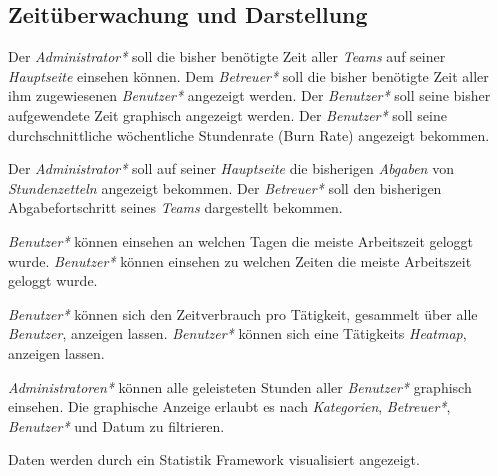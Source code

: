 \subsection{Zeitüberwachung und Darstellung}
    \begin{requirements}
        \begin{requirements}
             Der \emph{Administrator*} soll die bisher benötigte Zeit aller \emph{Teams} auf seiner \emph{Hauptseite} einsehen können.
             Dem \emph{Betreuer*} soll die bisher benötigte Zeit aller ihm zugewiesenen \emph{Benutzer*} angezeigt werden.
             Der \emph{Benutzer*} soll seine bisher aufgewendete Zeit graphisch angezeigt werden.
             Der \emph{Benutzer*} soll seine durchschnittliche wöchentliche Stundenrate (Burn Rate) angezeigt bekommen.
        \end{requirements}

        \begin{requirements}
             Der \emph{Administrator*} soll auf seiner \emph{Hauptseite} die bisherigen \emph{Abgaben} von \emph{Stundenzetteln} angezeigt bekommen.
             Der \emph{Betreuer*} soll den bisherigen Abgabefortschritt seines \emph{Teams} dargestellt bekommen.
        \end{requirements}

        \begin{requirements}
             \emph{Benutzer*} können einsehen an welchen Tagen die meiste Arbeitszeit geloggt wurde.
             \emph{Benutzer*} können einsehen zu welchen Zeiten die meiste Arbeitszeit geloggt wurde.
        \end{requirements}

        \begin{requirements}
             \emph{Benutzer*} können sich den Zeitverbrauch pro Tätigkeit, gesammelt über alle \emph{Benutzer}, anzeigen lassen.
             \emph{Benutzer*} können sich eine Tätigkeits \emph{Heatmap}, anzeigen lassen.
        \end{requirements}
        
        \begin{requirements}
              \emph{Administratoren*} können alle geleisteten Stunden aller \emph{Benutzer*} graphisch einsehen.
              Die graphische Anzeige erlaubt es nach \emph{Kategorien}, \emph{Betreuer*}, \emph{Benutzer*} und Datum zu filtrieren.
        \end{requirements}

        Daten werden durch ein Statistik Framework visualisiert angezeigt.
    \end{requirements}

